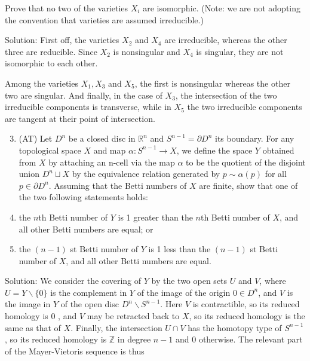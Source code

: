 \documentclass[10pt]{article}
\begin{document}
Prove that no two of the varieties $X_{i}$ are isomorphic. (Note: we are not adopting the convention that varieties are assumed irreducible.)

Solution: First off, the varieties $X_{2}$ and $X_{4}$ are irreducible, whereas the other three are reducible. Since $X_{2}$ is nonsingular and $X_{4}$ is singular, they are not isomorphic to each other.

Among the varieties $X_{1}, X_{3}$ and $X_{5}$, the first is nonsingular whereas the other two are singular. And finally, in the case of $X_{3}$, the intersection of the two irreducible components is transverse, while in $X_{5}$ the two irreducible components are tangent at their point of intersection.

\begin{enumerate}
  \setcounter{enumi}{2}
  \item (AT) Let $D^{n}$ be a closed disc in $\mathbb{R}^{n}$ and $S^{n-1}=\partial D^{n}$ its boundary. For any topological space $X$ and map $\alpha: S^{n-1} \rightarrow X$, we define the space $Y$ obtained from $X$ by attaching an n-cell via the map $\alpha$ to be the quotient of the disjoint union $D^{n} \sqcup X$ by the equivalence relation generated by $p \sim \alpha(p)$ for all $p \in \partial D^{n}$. Assuming that the Betti numbers of $X$ are finite, show that one of the two following statements holds:

  \item the $n$th Betti number of $Y$ is 1 greater than the $n$th Betti number of $X$, and all other Betti numbers are equal; or

  \item the $(n-1)$ st Betti number of $Y$ is 1 less than the $(n-1)$ st Betti number of $X$, and all other Betti numbers are equal.

\end{enumerate}

Solution: We consider the covering of $Y$ by the two open sets $U$ and $V$, where $U=Y \backslash\{0\}$ is the complement in $Y$ of the image of the origin $0 \in D^{n}$, and $V$ is the image in $Y$ of the open disc $D^{n} \backslash S^{n-1}$. Here $V$ is contractible, so its reduced homology is 0 , and $V$ may be retracted back to $X$, so its reduced homology is the same as that of $X$. Finally, the intersection $U \cap V$ has the homotopy type of $S^{n-1}$, so its reduced homology is $\mathbb{Z}$ in degree $n-1$ and 0 otherwise. The relevant part of the Mayer-Vietoris sequence is thus
\end{document}
